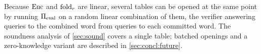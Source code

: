 \begin{remark}\label{rem:batch}
Because $\mathrm{Enc}$ and $\mathrm{fold}_r$ are linear, several tables can be opened at the same point by running $\Pi_{\mathrm{eval}}$ on a random linear combination of them, the verifier answering queries to the combined word from queries to each committed word.
The soundness analysis of \cref{sec:sound} covers a single table; batched openings and a zero-knowledge variant are described in \cref{sec:concl:future}.
\end{remark}
